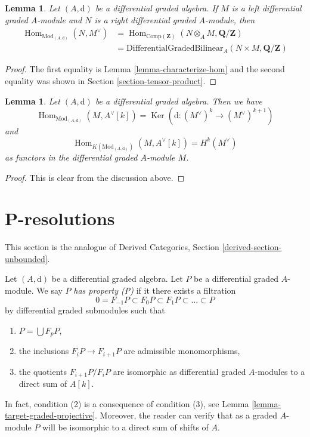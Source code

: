 \documentclass{stacks-project}
\theoremstyle{plain}
\newtheorem{lemma}[subsection]{Lemma}
\theoremstyle{definition}
\theoremstyle{remark}
\numberwithin{equation}{subsection}
\def\Hom{\mathop{\mathrm{Hom}}\nolimits}
\def\Ker{\mathop{\mathrm{Ker}}}
\begin{document}
\begin{lemma}
\label{lemma-map-into-dual}
Let $(A, \text{d})$ be a differential graded algebra. If
$M$ is a left differential graded $A$-module and $N$ is a
right differential graded $A$-module, then
\begin{align*}
\Hom_{\text{Mod}_{(A, \text{d})}}(N, M^\vee)
& =
\Hom_{\text{Comp}(\mathbf{Z})}(N \otimes_A M, \mathbf{Q}/\mathbf{Z}) \\
& =
\text{DifferentialGradedBilinear}_A(N \times M, \mathbf{Q}/\mathbf{Z})
\end{align*}
\end{lemma}

\begin{proof}
The first equality is Lemma \ref{lemma-characterize-hom}
and the second equality was shown in Section \ref{section-tensor-product}.
\end{proof}

\begin{lemma}
\label{lemma-hom-into-shift-dual-free}
Let $(A, \text{d})$ be a differential graded algebra. Then we have
$$
\Hom_{\text{Mod}_{(A, \text{d})}}(M, A^\vee[k]) =
\Ker(\text{d} : (M^\vee)^k \to (M^\vee)^{k + 1})
$$
and
$$
\Hom_{K(\text{Mod}_{(A, \text{d})})}(M, A^\vee[k]) = H^k(M^\vee)
$$
as functors in the differential graded $A$-module $M$.
\end{lemma}

\begin{proof}
This is clear from the discussion above.
\end{proof}















\section{P-resolutions}
\label{section-P-resolutions}

\noindent
This section is the analogue of
Derived Categories, Section \ref{derived-section-unbounded}.

\medskip\noindent
Let $(A, \text{d})$ be a differential graded algebra.
Let $P$ be a differential graded $A$-module. We say $P$
{\it has property (P)} if it there exists a filtration
$$
0 = F_{-1}P \subset F_0P \subset F_1P \subset \ldots \subset P
$$
by differential graded submodules such that
\begin{enumerate}
\item $P = \bigcup F_pP$,
\item the inclusions $F_iP \to F_{i + 1}P$ are admissible
monomorphisms,
\item the quotients $F_{i + 1}P/F_iP$ are isomorphic as differential
graded $A$-modules to a direct sum of $A[k]$.
\end{enumerate}
In fact, condition (2) is a consequence of condition (3), see
Lemma \ref{lemma-target-graded-projective}. Moreover, the reader
can verify that as a graded $A$-module $P$ will be isomorphic to a
direct sum of shifts of $A$.
\end{document}
